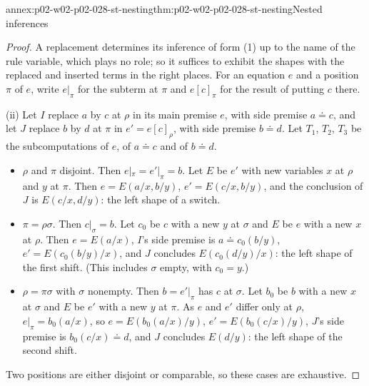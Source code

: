 \begin{annexitem}{annex:p02-w02-p02-028-st-nesting}{thm:p02-w02-p02-028-st-nesting}{Nested inferences}
\begin{proof}
A replacement determines its inference of form (1) up to the name of the
rule variable, which plays no role; so it suffices to exhibit the shapes with
the replaced and inserted terms in the right places.  For an equation \(e\)
and a position \(\pi\) of \(e\), write \(e|_\pi\) for the subterm at \(\pi\)
and \(e[c]_\pi\) for the result of putting \(c\) there.

(ii)  Let \(I\) replace \(a\) by \(c\) at \(\rho\) in its main premise \(e\),
with side premise \(a\doteq c\), and let \(J\) replace \(b\) by \(d\) at
\(\pi\) in \(e'=e[c]_\rho\), with side premise \(b\doteq d\).  Let \(T_1\),
\(T_2\), \(T_3\) be the subcomputations of \(e\), of \(a\doteq c\) and of
\(b\doteq d\).
\begin{itemize}
  \item \(\rho\) and \(\pi\) disjoint.  Then \(e|_\pi=e'|_\pi=b\).  Let
        \(E\) be \(e'\) with new variables \(x\) at \(\rho\) and \(y\) at
        \(\pi\).  Then \(e=E(a/x,b/y)\), \(e'=E(c/x,b/y)\), and the
        conclusion of \(J\) is \(E(c/x,d/y)\): the left shape of a switch.
  \item \(\pi=\rho\sigma\).  Then \(c|_\sigma=b\).  Let \(c_0\) be \(c\) with
        a new \(y\) at \(\sigma\) and \(E\) be \(e\) with a new \(x\) at
        \(\rho\).  Then \(e=E(a/x)\), \(I\)'s side premise is
        \(a\doteq c_0(b/y)\), \(e'=E(c_0(b/y)/x)\), and \(J\) concludes
        \(E(c_0(d/y)/x)\): the left shape of the first shift.  (This includes
        \(\sigma\) empty, with \(c_0=y\).)
  \item \(\rho=\pi\sigma\) with \(\sigma\) nonempty.  Then \(b=e'|_\pi\) has
        \(c\) at \(\sigma\).  Let \(b_0\) be \(b\) with a new \(x\) at
        \(\sigma\) and \(E\) be \(e'\) with a new \(y\) at \(\pi\).  As \(e\)
        and \(e'\) differ only at \(\rho\), \(e|_\pi=b_0(a/x)\), so
        \(e=E(b_0(a/x)/y)\), \(e'=E(b_0(c/x)/y)\), \(J\)'s side premise is
        \(b_0(c/x)\doteq d\), and \(J\) concludes \(E(d/y)\): the left shape
        of the second shift.
\end{itemize}
Two positions are either disjoint or comparable, so these cases are
exhaustive.


\end{proof}
\end{annexitem}
